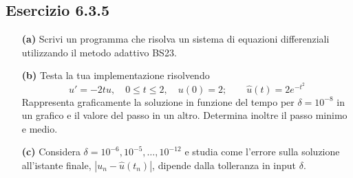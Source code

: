 \documentclass[letterpaper, 12pt]{article}
\numberwithin{equation}{section}    %
\begin{document}
\subsection{Esercizio 6.3.5}
\label{es:6_3_5}
\begin{itemize}
    \item[\textbf{(a)}] Scrivi un programma che risolva un sistema di equazioni differenziali utilizzando 
    il metodo adattivo BS23.
    \item[\textbf{(b)}] Testa la tua implementazione risolvendo
    \[
        u' = -2t u, \quad 0 \le t \le 2, \quad u(0) = 2; \qquad \hat{u}(t) = 2e^{-t^2}
    \]
    Rappresenta graficamente la soluzione in funzione del tempo per $\delta=10^{-8}$ in un grafico e il 
    valore del passo in un altro. Determina inoltre il passo minimo e medio.
    \item[\textbf{(c)}] Considera $\delta=10^{-6},10^{-5},\ldots,10^{-12}$ e studia come l'errore sulla 
    soluzione all'istante finale, $|u_n-\hat{u}(t_n)|$, dipende dalla tolleranza in input $\delta$.
\end{itemize}
\end{document}
